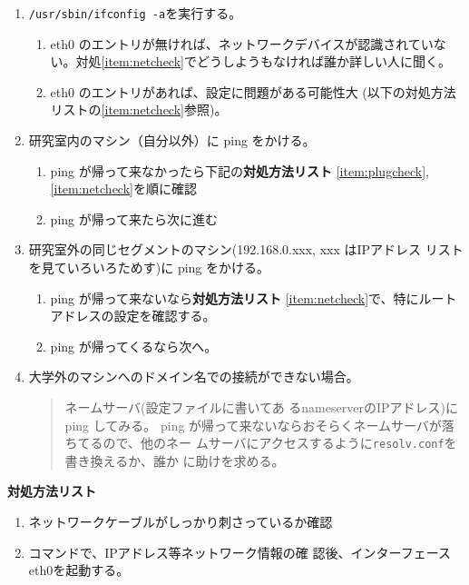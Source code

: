 \documentclass{jreport}
\begin{document}
\begin{enumerate}
\item \verb|/usr/sbin/ifconfig -a|を実行する。
  \begin{enumerate}
  \item eth0 のエントリが無ければ、ネットワークデバイスが認識されていな
    い。対処\ref{item:netcheck}でどうしようもなければ誰か詳しい人に聞く。
  \item eth0 のエントリがあれば、設定に問題がある可能性大
    (以下の対処方法リストの\ref{item:netcheck}参照)。
  \end{enumerate}
\item 研究室内のマシン（自分以外）に ping をかける。
  \begin{enumerate}
  \item ping が帰って来なかったら下記の\textbf{対処方法リスト}
    \ref{item:plugcheck},\ref{item:netcheck}を順に確認
  \item ping が帰って来たら次に進む
  \end{enumerate}
\item 研究室外の同じセグメントのマシン(192.168.0.xxx, xxx はIPアドレス
  リストを見ていろいろためす)に ping をかける。 
  \begin{enumerate}
  \item ping が帰って来ないなら\textbf{対処方法リスト}
    \ref{item:netcheck}で、特にルートアドレスの設定を確認する。
  \item ping が帰ってくるなら次へ。
  \end{enumerate}
\item 大学外のマシンへのドメイン名での接続ができない場合。
  \begin{quote}
    ネームサーバ(設定ファイルに書いてあ
    るnameserverのIPアドレス)にping してみる。
    ping が帰って来ないならおそらくネームサーバが落ちてるので、他のネー
    ムサーバにアクセスするように\verb|resolv.conf|を書き換えるか、誰か
    に助けを求める。
  \end{quote}
\end{enumerate}

\noindent
\textbf{対処方法リスト}
\begin{enumerate}
\item \label{item:plugcheck}ネットワークケーブルがしっかり刺さっているか確認
\item \label{item:netcheck}
  コマンドで、IPアドレス等ネットワーク情報の確
  認後、インターフェースeth0を起動する。
\end{enumerate}
\end{document}
